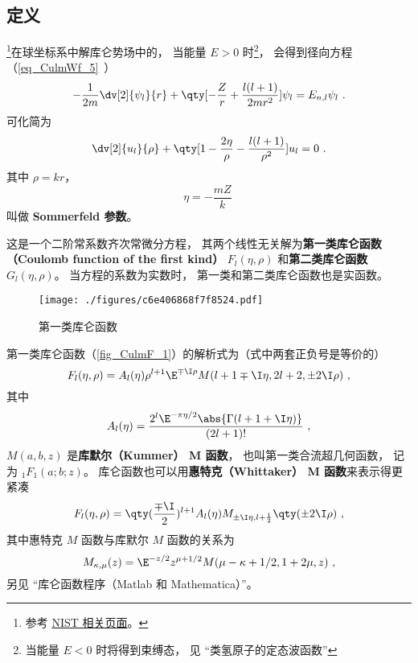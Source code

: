 

\subsection{定义}
\footnote{参考 \href{https://dlmf.nist.gov/33.2}{NIST 相关页面}。}在球坐标系中解库仑势场中的， 当能量 $E > 0$ 时\footnote{当能量 $E < 0$ 时将得到束缚态， 见 “类氢原子的定态波函数”}， 会得到径向方程（\autoref{eq_CulmWf_5}~）
\begin{equation}%
-\frac{1}{2m} \dv[2]{\psi_{l}}{r} + \qty[-\frac{Z}{r} + \frac{l(l + 1)}{2mr^2}]\psi_{l} = E_{n, l} \psi_{l}~.
\end{equation}
可化简为
\begin{equation}
\dv[2]{u_l}{\rho} + \qty[1 - \frac{2\eta}{\rho} - \frac{l(l+1)}{\rho^2}]u_l = 0~.
\end{equation}
其中 $\rho = kr$，
\begin{equation}
\eta = -\frac{mZ}{k}~
\end{equation}
叫做 \textbf{Sommerfeld 参数}。

这是一个二阶常系数齐次常微分方程， 其两个线性无关解为\textbf{第一类库仑函数（Coulomb function of the first kind）} $F_l(\eta, \rho)$ 和\textbf{第二类库仑函数} $G_l(\eta, \rho)$。 当方程的系数为实数时， 第一类和第二类库仑函数也是实函数。

\begin{figure}[ht]
\centering
\texttt{[image: ./figures/c6e406868f7f8524.pdf]}
\caption{第一类库仑函数} \label{fig_CulmF_1}
\end{figure}

第一类库仑函数（\autoref{fig_CulmF_1}）的解析式为（式中两套正负号是等价的）
\begin{equation}\label{eq_CulmF_1}
F_l(\eta, \rho) = A_l(\eta) \rho^{l+1} \E^{\mp\I\rho} M(l+1\mp\I\eta, 2l+2, \pm 2\I\rho)~,
\end{equation}
其中
\begin{equation}
A_l(\eta) = \frac{2^l \E^{-\pi\eta/2} \abs{\Gamma(l+1+\I\eta)}}{(2l+1)!}~,
\end{equation}
$M(a, b, z)$ 是\textbf{库默尔（Kummer） M 函数}， 也叫第一类合流超几何函数， 记为 $_1 F_1(a;b;z)$。 库仑函数也可以用\textbf{惠特克（Whittaker） M 函数}来表示得更紧凑
\begin{equation}\label{eq_CulmF_2}
F_l(\eta, \rho) = \qty(\frac{\mp\I}{2})^{l+1} A_l(\eta) M_{\pm\I\eta, l+\frac12}\qty(\pm 2\I\rho)~,
\end{equation}
其中惠特克 $M$ 函数与库默尔 $M$ 函数的关系为
\begin{equation}
M_{\kappa, \mu}(z) = \E^{-z/2} z^{\mu + 1/2} M(\mu - \kappa + 1/2, 1 + 2\mu, z)~,
\end{equation}
另见 “库仑函数程序（Matlab 和 Mathematica）”。


